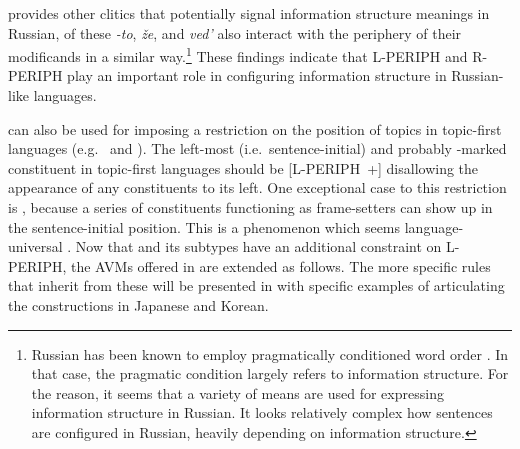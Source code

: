 \noindent \citet{gracheva:13} provides other clitics that potentially
signal information structure meanings in Russian, of these
\textit{-to}, \textit{\v{z}e}, and \textit{ved'} also interact with
the periphery of their modificands in a similar way.\footnote{Russian
  has been known to employ pragmatically conditioned word order
  \citep{rodionova:01}. In that case, the pragmatic condition largely
  refers to information structure. For the reason, it seems that a
  variety of means are used for expressing information structure in
  Russian. It looks relatively complex how sentences are configured in
  Russian, heavily depending on information structure.}  These
findings indicate that L-PERIPH and R-PERIPH play an important role in
configuring information structure in Russian-like
languages.


 can also be used for imposing a restriction on the
position of topics in topic-first languages (e.g.\  and
).  The left-most (i.e.\ sentence-initial) and probably
-marked constituent in topic-first languages should be
\mbox{[L-PERIPH +]} disallowing the appearance of any constituents to
its left.  One exceptional case to this restriction is
, because a series of constituents functioning as
frame-setters can show up in the sentence-initial position. This is a
phenomenon which seems language-universal
\citep{li:thompson:76,chafe:76,lambrecht:96}. Now that
 and its subtypes have an additional constraint on
L-PERIPH, the AVMs offered in
  are extended as
follows. The more specific rules that inherit from
these will be presented in
  with specific
examples of articulating the  constructions in
Japanese and Korean.





